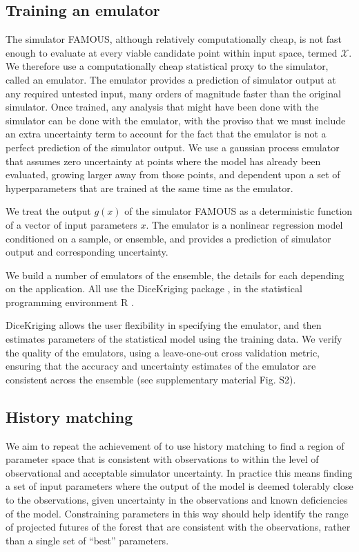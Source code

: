 \documentclass[esd, manuscript]{copernicus}
\begin{document}
\subsection{Training an emulator}\label{ssec:emulator}
The simulator FAMOUS, although relatively computationally cheap, is not fast enough to evaluate at every viable candidate point within input space, termed $\mathcal{X}$. We therefore use a computationally cheap statistical proxy to the simulator, called an emulator. The emulator provides a prediction of simulator output at any required untested input, many orders of magnitude faster than the original simulator.  Once trained, any analysis that might have been done with the simulator can be done with the emulator, with the proviso that we must include an extra uncertainty term to account for the fact that the emulator is not a perfect prediction of the simulator output. We use a gaussian process emulator that assumes zero uncertainty at points where the model has already been evaluated, growing larger away from those points, and dependent upon a set of hyperparameters that are trained at the same time as the emulator. 

We treat the output $g(x)$ of the simulator FAMOUS as a deterministic function of a vector of input parameters $x$. The emulator is a nonlinear regression model conditioned on a sample, or ensemble, and provides a prediction of simulator output and corresponding uncertainty.

We build a number of emulators of the ensemble, the details for each depending on the application. All use the DiceKriging package \citep{roustant2012dicekriging}, in the statistical programming environment R \citep{Rcore2016}.

DiceKriging allows the user flexibility in specifying the emulator, and then estimates parameters of the statistical model using the training data. We verify the quality of the emulators, using a leave-one-out cross validation metric, ensuring that the accuracy and uncertainty estimates of the emulator are consistent across the ensemble (see supplementary material Fig. S2). 

\subsection{History matching}\label{ssec:historymatching}
We aim to repeat the achievement of \cite{williamson2014identifying} to use history matching to find a region of parameter space that is consistent with observations to within the level of observational and acceptable simulator uncertainty. In practice this means finding a set of input parameters where the output of the model is deemed tolerably close to the observations, given uncertainty in the observations and known deficiencies of the model. Constraining parameters in this way should help identify the range of projected futures of the forest that are consistent with the observations, rather than a single set of ``best'' parameters.
\end{document}
